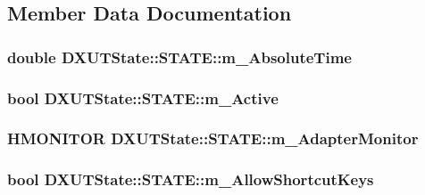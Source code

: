 \subsection{Member Data Documentation}
\hypertarget{struct_d_x_u_t_state_1_1_s_t_a_t_e_a35148067e45d29d4b3c4ae62682ace0a}{
\subsubsection[{m\_\-AbsoluteTime}]{\setlength{\rightskip}{0pt plus 5cm}double {\bf DXUTState::STATE::m\_\-AbsoluteTime}}}
\label{struct_d_x_u_t_state_1_1_s_t_a_t_e_a35148067e45d29d4b3c4ae62682ace0a}
\hypertarget{struct_d_x_u_t_state_1_1_s_t_a_t_e_a40f0adbabbd1742c8a53f1d1db879b26}{
\subsubsection[{m\_\-Active}]{\setlength{\rightskip}{0pt plus 5cm}bool {\bf DXUTState::STATE::m\_\-Active}}}
\label{struct_d_x_u_t_state_1_1_s_t_a_t_e_a40f0adbabbd1742c8a53f1d1db879b26}
\hypertarget{struct_d_x_u_t_state_1_1_s_t_a_t_e_a71c6d350b032d377728ba18e5b90deed}{
\subsubsection[{m\_\-AdapterMonitor}]{\setlength{\rightskip}{0pt plus 5cm}HMONITOR {\bf DXUTState::STATE::m\_\-AdapterMonitor}}}
\label{struct_d_x_u_t_state_1_1_s_t_a_t_e_a71c6d350b032d377728ba18e5b90deed}
\hypertarget{struct_d_x_u_t_state_1_1_s_t_a_t_e_a1993cb637d5f32d905968688169da93f}{
\subsubsection[{m\_\-AllowShortcutKeys}]{\setlength{\rightskip}{0pt plus 5cm}bool {\bf DXUTState::STATE::m\_\-AllowShortcutKeys}}}
\label{struct_d_x_u_t_state_1_1_s_t_a_t_e_a1993cb637d5f32d905968688169da93f}
